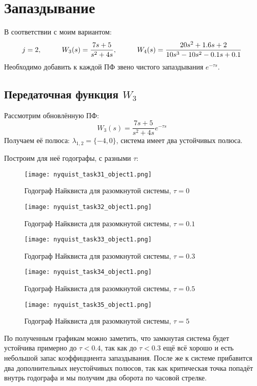 \chapter{Запаздывание}
\label{ch:chap3}

В соответствии с моим вариантом:
$$
    j=2, \hspace*{1cm} W_3(s) = \frac{7s+5}{s^2 + 4s}, \hspace*{1cm} W_4(s) = \frac{20s^2 +1.6s +2}{10s^3-10s^2-0.1s+0.1}
$$
Необходимо добавить к каждой ПФ звено чистого запаздывания $e^{-\tau s}$.

\section{Передаточная функция $W_3$}

Рассмотрим обновлённую ПФ:
$$
    W_3(s) = \frac{7s+5}{s^2 + 4s}e^{-\tau s}
$$
Получаем её полюса: $\lambda_{1,2} = \{-4, 0\}$, система имеет два устойчивых полюса.

Построим для неё годографы, с разными $\tau$:
\begin{figure}[ht]
    \centering
    \texttt{[image: nyquist\_task31\_object1.png]}
    \caption{Годограф Найквиста для разомкнутой системы, $\tau=0$}
\end{figure}
\newpage
\begin{figure}[ht]
    \centering
    \texttt{[image: nyquist\_task32\_object1.png]}
    \caption{Годограф Найквиста для разомкнутой системы, $\tau=0.1$}
\end{figure}
\begin{figure}[ht]
    \centering
    \texttt{[image: nyquist\_task33\_object1.png]}
    \caption{Годограф Найквиста для разомкнутой системы, $\tau=0.3$}
\end{figure}
\newpage
\begin{figure}[ht]
    \centering
    \texttt{[image: nyquist\_task34\_object1.png]}
    \caption{Годограф Найквиста для разомкнутой системы, $\tau=0.5$}
\end{figure}
\begin{figure}[ht]
    \centering
    \texttt{[image: nyquist\_task35\_object1.png]}
    \caption{Годограф Найквиста для разомкнутой системы, $\tau=5$}
\end{figure}
\newpage
По полученным графикам можно заметить, что замкнутая система будет устойчива примерно до  $\tau< 0.4$, так как до $\tau < 0.3$ ещё всё хорошо и есть небольшой запас коэффицциента запаздывания. После же к системе прибавится два дополнительных неустойчивых полюсов, так как критическая точка попадёт внутрь годографа
и мы получим два оборота по часовой стрелке.

